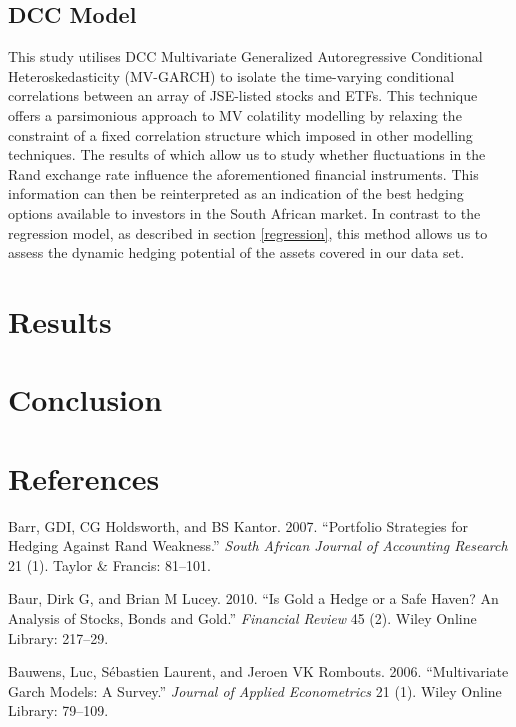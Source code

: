 \documentclass[11pt,preprint, authoryear]{elsarticle}
\numberwithin{equation}{section}
\numberwithin{figure}{section}
\numberwithin{table}{section}
\begin{document}
\subsection{DCC Model}\label{dcc-model}

This study utilises DCC Multivariate Generalized Autoregressive
Conditional Heteroskedasticity (MV-GARCH) to isolate the time-varying
conditional correlations between an array of JSE-listed stocks and ETFs.
This technique offers a parsimonious approach to MV colatility modelling
by relaxing the constraint of a fixed correlation structure which
imposed in other modelling techniques. The results of which allow us to
study whether fluctuations in the Rand exchange rate influence the
aforementioned financial instruments. This information can then be
reinterpreted as an indication of the best hedging options available to
investors in the South African market. In contrast to the regression
model, as described in section \ref{regression}, this method allows us
to assess the dynamic hedging potential of the assets covered in our
data set.

\section{Results}\label{results}

\section{Conclusion}\label{conclusion}

\section*{References}\label{references}

\hypertarget{refs}{}
\hypertarget{ref-barr2007}{}
Barr, GDI, CG Holdsworth, and BS Kantor. 2007. ``Portfolio Strategies
for Hedging Against Rand Weakness.'' \emph{South African Journal of
Accounting Research} 21 (1). Taylor \& Francis: 81--101.

\hypertarget{ref-baur2010}{}
Baur, Dirk G, and Brian M Lucey. 2010. ``Is Gold a Hedge or a Safe
Haven? An Analysis of Stocks, Bonds and Gold.'' \emph{Financial Review}
45 (2). Wiley Online Library: 217--29.

\hypertarget{ref-bauwens2006}{}
Bauwens, Luc, Sébastien Laurent, and Jeroen VK Rombouts. 2006.
``Multivariate Garch Models: A Survey.'' \emph{Journal of Applied
Econometrics} 21 (1). Wiley Online Library: 79--109.
\end{document}
